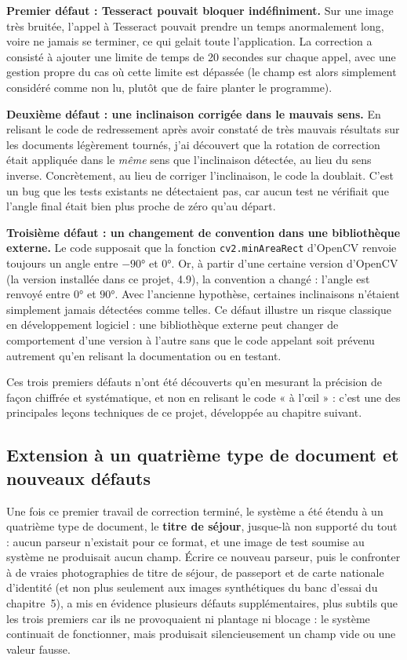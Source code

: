 \textbf{Premier défaut : Tesseract pouvait bloquer indéfiniment.} Sur une image très bruitée, l'appel à Tesseract pouvait prendre un temps anormalement long, voire ne jamais se terminer, ce qui gelait toute l'application. La correction a consisté à ajouter une limite de temps de 20 secondes sur chaque appel, avec une gestion propre du cas où cette limite est dépassée (le champ est alors simplement considéré comme non lu, plutôt que de faire planter le programme).

\textbf{Deuxième défaut : une inclinaison corrigée dans le mauvais sens.} En relisant le code de redressement après avoir constaté de très mauvais résultats sur les documents légèrement tournés, j'ai découvert que la rotation de correction était appliquée dans le \emph{même} sens que l'inclinaison détectée, au lieu du sens inverse. Concrètement, au lieu de corriger l'inclinaison, le code la doublait. C'est un bug que les tests existants ne détectaient pas, car aucun test ne vérifiait que l'angle final était bien plus proche de zéro qu'au départ.

\textbf{Troisième défaut : un changement de convention dans une bibliothèque externe.} Le code supposait que la fonction \texttt{cv2.minAreaRect} d'OpenCV renvoie toujours un angle entre $-90°$ et $0°$. Or, à partir d'une certaine version d'OpenCV (la version installée dans ce projet, 4.9), la convention a changé : l'angle est renvoyé entre $0°$ et $90°$. Avec l'ancienne hypothèse, certaines inclinaisons n'étaient simplement jamais détectées comme telles. Ce défaut illustre un risque classique en développement logiciel : une bibliothèque externe peut changer de comportement d'une version à l'autre sans que le code appelant soit prévenu autrement qu'en relisant la documentation ou en testant.

Ces trois premiers défauts n'ont été découverts qu'en mesurant la précision de façon chiffrée et systématique, et non en relisant le code « à l'œil » : c'est une des principales leçons techniques de ce projet, développée au chapitre suivant.

\subsection{Extension à un quatrième type de document et nouveaux défauts}

Une fois ce premier travail de correction terminé, le système a été étendu à un quatrième type de document, le \textbf{titre de séjour}, jusque-là non supporté du tout : aucun parseur n'existait pour ce format, et une image de test soumise au système ne produisait aucun champ. Écrire ce nouveau parseur, puis le confronter à de vraies photographies de titre de séjour, de passeport et de carte nationale d'identité (et non plus seulement aux images synthétiques du banc d'essai du chapitre~5), a mis en évidence plusieurs défauts supplémentaires, plus subtils que les trois premiers car ils ne provoquaient ni plantage ni blocage : le système continuait de fonctionner, mais produisait silencieusement un champ vide ou une valeur fausse.

